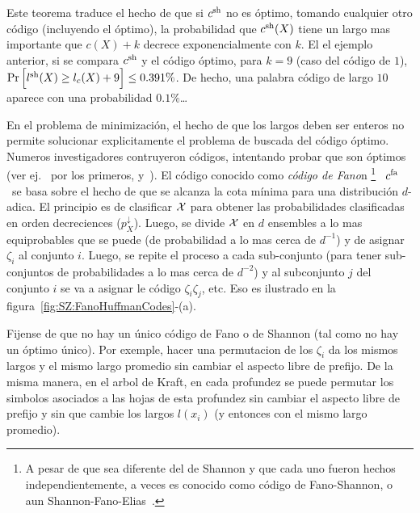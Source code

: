 %
Este  teorema  traduce el  hecho  de  que si  $c^{\mathrm{sh}}$  no  es \'optimo,  tomando
cualquier otro c\'odigo (incluyendo el \'optimo), la probabilidad que $c^{\mathrm{sh}}(X)$
tiene un largo mas importante  que $c(X)+k$ decrece exponencialmente con $k$. El
el ejemplo anterior, si se compara $c^{\mathrm{sh}}$  y el c\'odigo \'optimo, para $k = 9$
(caso del  c\'odigo de  $1$), $\Pr\Big[  l^{\mathrm{sh}}(X) \ge l_c(X)  + 9  \Big] \le
0.391  \%$.  De hecho,  una  palabra  c\'odigo de  largo  $10$  aparece con  una
probabilidad $0.1\%$\ldots

En el problema  de minimizaci\'on, el hecho de que los  largos deben ser enteros
no  permite  solucionar  explicitamente  el  problema de  buscada  del  c\'odigo
\'optimo.  Numeros  investigadores contruyeron c\'odigos,  intentando probar que
son  \'optimos   (ver  ej.~\cite{Sha48,  ShaWea64,  Fan49}   por  los  primeros,
y~\cite[\& ref.]{CovTho06}).  El c\'odigo conocido como {\it  c\'odigo de Fano}n
\footnote{A pesar  de que  sea diferente del  de Shannon  y que cada  uno fueron
  hechos independientemente, a veces  es conocido como c\'odigo de Fano-Shannon,
  o aun Shannon-Fano-Elias~\cite{CovTho06, KraLiu15}.} \ $c^{\mathrm{fa}}$ \ se basa sobre
el hecho de  que se alcanza la cota m\'inima  para una distribuci\'on $d$-adica.
El principio es de clasificar  $\mathcal{X}$ para obtener las probabilidades clasificadas
en orden decreciences ($p_X^\downarrow$). Luego, se divide $\mathcal{X}$ en $d$ ensembles
a lo  mas equiprobables  que se  puede (\ie de  probabilidad a  lo mas  cerca de
$d^{-1}$) y de asignar $\zeta_i$ al conjunto $i$.  Luego, se repite el proceso a
cada sub-conjunto (para tener sub-conjuntos  de probabilidades a lo mas cerca de
$d^{-2}$) y  al subconjunto  $j$ del conjunto  $i$ se  va a asignar  le c\'odigo
$\zeta_i      \zeta_j$,      etc.      Eso      es      ilustrado     en      la
figura~\ref{fig:SZ:FanoHuffmanCodes}-(a).  

Fijense de que no hay un \'unico c\'odigo  de Fano o de Shannon (tal como no hay
un \'optimo  \'unico).  Por exemple, hacer  una permutacion de  los $\zeta_i$ da
los mismos  largos y  el mismo largo  promedio sin  cambiar el aspecto  libre de
prefijo. De la  misma manera, en el  arbol de Kraft, en cada  profundez se puede
permutar los  simbolos asociados a  las hojas de  esta profundez sin  cambiar el
aspecto libre de prefijo y sin que cambie los largos $l(x_i)$ (y entonces con el
mismo largo promedio).


